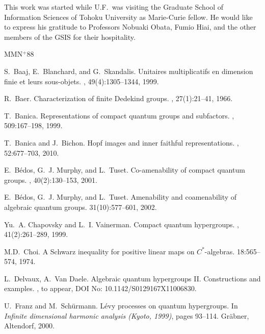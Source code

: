 \documentclass[12pt]{amsart}
\theoremstyle{definition}
\theoremstyle{remark}
\numberwithin{equation}{section}
\begin{document}
This work was started while U.F.\ was visiting the Graduate School of
Information Sciences of Tohoku University as Marie-Curie fellow. He would like
to express his gratitude to Professors Nobuaki Obata, Fumio Hiai, and the
other members of the GSIS for their hospitality.

\begin{thebibliography}{MMN{{$^{{+}}$}}88}

S.~Baaj, E.~Blanchard, and G.~Skandalis.
\newblock Unitaires multiplicatifs en dimension finie et leurs sous-objets.
, 49(4):1305--1344, 1999.

R.~Baer. \newblock  Characterization of finite Dedekind groups. 
, 27(1):21--41, 1966.

T.~Banica.
\newblock Representations of compact quantum groups and subfactors.
, 509:167--198, 1999.

T.~Banica and J.~Bichon.
\newblock Hopf images and inner faithful representations.
, 52:677--703, 2010.

E.~B{\'e}dos, G.~J. Murphy, and L.~Tuset.
\newblock Co-amenability of compact quantum groups.
, 40(2):130--153, 2001.

E.~B{\'e}dos, G.~J. Murphy, and L.~Tuset.
\newblock Amenability and coamenability of algebraic quantum
groups.  31(10):577--601, 2002.

Yu.~A. Chapovsky and L.~I. Vainerman.
\newblock Compact quantum hypergroups.
, 41(2):261--289, 1999.

 M.D.~Choi.
\newblock A Schwarz inequality for positive linear maps on $C^*$-algebras.
 18:565--574, 1974.

 L.~Delvaux, A.~Van Daele.
\newblock  Algebraic quantum hypergroups II. Constructions and examples.
, to appear, DOI No: 10.1142/S0129167X11006830.

U.~Franz and M.~Sch{\"u}rmann.
\newblock L\'evy processes on quantum hypergroups.
\newblock In {\em Infinite dimensional harmonic analysis (Kyoto, 1999)}, pages
  93--114. Gr{\"a}bner, Altendorf, 2000.


\end{thebibliography}
\end{document}
